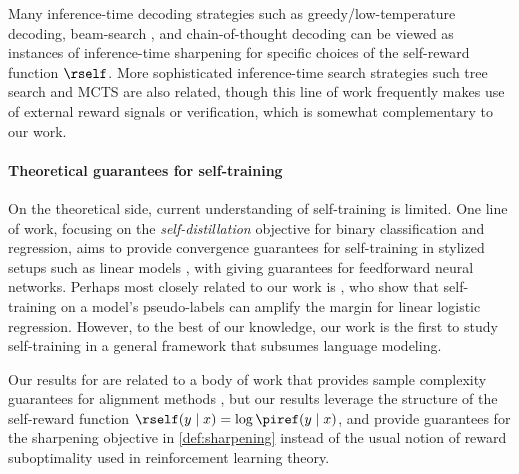 Many inference-time decoding
strategies such as greedy/low-temperature decoding, beam-search
\citep{meister2020if}, and chain-of-thought decoding
\citep{wang2024chain} can be viewed as instances of inference-time
sharpening for specific choices of the self-reward function
$\rself$. More sophisticated inference-time search strategies such
tree search and MCTS
\citep{yao2024tree,wan2024alphazero,mudgal2023controlled,zhao2024probabilistic}
are also related, though this line of work frequently makes use of
external reward signals or verification, which is somewhat
complementary to our work.





\paragraph{Theoretical guarantees for self-training}
      On the theoretical side, current understanding of self-training is limited. One line of work, focusing on the
      \emph{self-distillation} objective \citep{hinton2015distilling}
      for binary classification and regression, aims to provide convergence
      guarantees for self-training in stylized setups such as linear
      models
      \citep{mobahi2020self,das2023understanding,das2024retraining,pareek2024understanding},
      with \iftoggle{workshop}{\cite{allen2020towards}}{\citet{allen2020towards}} giving guarantees for feedforward
      neural networks. Perhaps most closely related to our work is
      \iftoggle{workshop}{\cite{frei2022self}}{\citet{frei2022self}}, who show that self-training on a model's
      pseudo-labels can amplify the margin for linear logistic
      regression. However, to the best of our knowledge, our work is the first to study
      self-training in a general framework that subsumes language modeling.

Our results for \rlhfalg are related
to a body of work that provides sample complexity guarantees
for alignment methods
\citep{zhu2023principled,xiong2023gibbs,ye2024theoretical,huang2024correcting,liu2024provably,song2024understanding,xie2024exploratory},
but our results leverage the structure of the
\mlsharp self-reward function $\rself(y\mid{}x)=\log\piref(y\mid{}x)$, and
provide guarantees for the sharpening objective in
\cref{def:sharpening} instead of the usual notion of reward
suboptimality used in reinforcement learning theory.\loose


